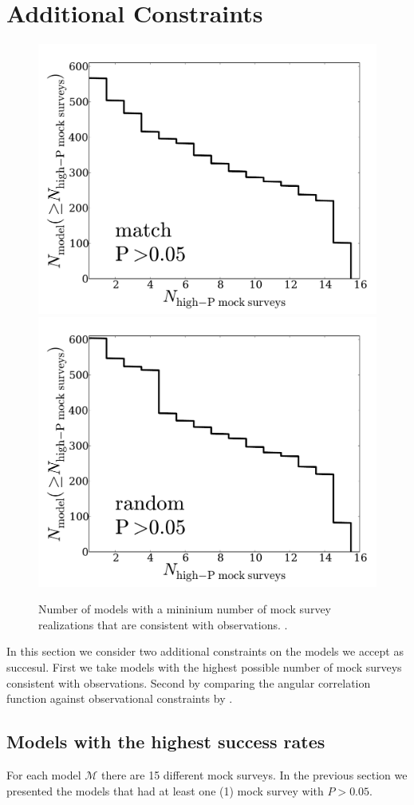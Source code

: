 \documentclass[usenatbib]{mn2e}
\begin{document}
\section{Additional Constraints}

\begin{figure}
\begin{center}
\includegraphics[width=0.46\linewidth,angle=0]{./plots/Fig4_match_P5.pdf}
\hspace{5mm}
\includegraphics[width=0.46\linewidth,angle=0]{./plots/Fig4_random_P5.pdf}
\end{center} 
\caption{ Number of models with a mininium number of mock survey
  realizations that are consistent with observations.
  \label{fig:high_success_rate}.}  
\end{figure}
 
In this section we consider two additional constraints on the models
we accept as succesul. First we take models with the
highest possible number of mock surveys consistent with
observations. Second by comparing the angular correlation function
against observational constraints by \cite{Hayashino2004}. 

\subsection{Models with the highest success rates}

For each model ${\mathcal M}$ there are 15 different mock surveys. In the
previous section we presented the models that had at least one (1)
mock survey with $P>0.05$.
\end{document}
